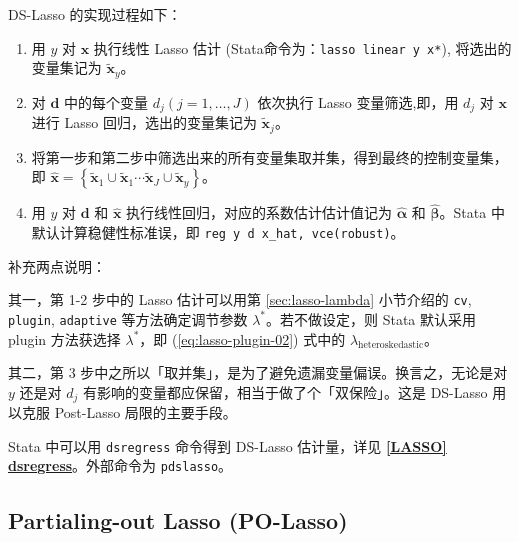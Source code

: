 \vspace{5pt}
DS-Lasso 的实现过程如下：
\begin{enumerate}
\item 用 $y$ 对 $\mathbf{x}$ 执行线性 Lasso 估计 (Stata命令为：\texttt{lasso linear y x*}), 将选出的变量集记为 $\widetilde{\mathbf{x}}_{y}$。
\item 对 $\mathbf{d}$ 中的每个变量 $d_{j} (j=1, \ldots, J)$ 依次执行 Lasso 变量筛选,即，用 $d_{j}$ 对 $\mathbf{x}$ 进行 Lasso 回归，选出的变量集记为 $\widetilde{\mathbf{x}}_{j}$。
\item 将第一步和第二步中筛选出来的所有变量集取并集，得到最终的控制变量集，即  $\widehat{\mathbf{x}} = \left\{\widetilde{\mathbf{x}}_{1} \cup \widetilde{\mathbf{x}}_{1} \cdots \widetilde{\mathbf{x}}_{J} \cup \widetilde{\mathbf{x}}_{y}\right\}$。
\item 用 $y$ 对 $\mathbf{d}$ 和 $\widehat{\mathbf{x}}$ 执行线性回归，对应的系数估计估计值记为 $\widehat{\boldsymbol{\alpha}}$ 和 $\widehat{\boldsymbol{\beta}}$。Stata 中默认计算稳健性标准误，即 \texttt{reg y d x\_hat, vce(robust)}。
\end{enumerate}
补充两点说明：

其一，第 1-2 步中的 Lasso 估计可以用第 \ref{sec:lasso-lambda} 小节介绍的 \texttt{cv}, \texttt{plugin}, \texttt{adaptive} 等方法确定调节参数 $\lambda^*$。若不做设定，则 Stata 默认采用 plugin 方法获选择 $\lambda^*$，即 (\ref{eq:lasso-plugin-02}) 式中的 $\lambda_{\text {heteroskedastic}}$。

其二，第 3 步中之所以「取并集」，是为了避免遗漏变量偏误。换言之，无论是对 $y$ 还是对 $d_j$ 有影响的变量都应保留，相当于做了个「双保险」。这是 DS-Lasso 用以克服 Post-Lasso 局限的主要手段。
 


Stata 中可以用 \texttt{dsregress} 命令得到 DS-Lasso 估计量，详见 \href{https://www.stata.com/manuals/lassodsregress.pdf}{\bfseries{[\MakeUppercase{lasso}] dsregress}}。外部命令为 \texttt{pdslasso}。





\subsection{Partialing-out Lasso (PO-Lasso)}\label{sec:polasso}

